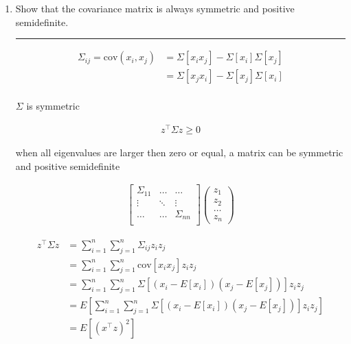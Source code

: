 \documentclass[12pt]{article}
\begin{document}
\begin{enumerate}
    \item Show that the covariance matrix is always symmetric and positive semidefinite.
     
    \noindent\rule{\linewidth}{1pt}
    \begin{align*}
        \Sigma_{ij} = \textrm{cov}(x_i,x_j) &= \Sigma[x_i x_j] - \Sigma[x_i] \Sigma[x_j] \\
                                          &= \Sigma[x_j x_i] - \Sigma[x_j] \Sigma[x_i] \\
    \end{align*}

    $\Sigma$ is symmetric

    \begin{align*}
        z^\intercal \Sigma z \geq 0
    \end{align*}
    
    when all eigenvalues are larger then zero or equal, a matrix can be symmetric and positive semidefinite

    \begin{align*}
        [z_1 z_2 \dots z_n] 
        \begin{bmatrix}
            \Sigma_{11}      &   \dots            &   \dots            \\
            \vdots           &   \ddots           &   \vdots           \\
            \dots            &   \dots            &   \Sigma_{nn}      \\
        \end{bmatrix}
        \begin{pmatrix}
            z_1     \\
            z_2     \\
            \dots  \\
            z_n
        \end{pmatrix}
    \end{align*}

    \begin{align*}
        z^\intercal \Sigma z &= \sum_{i=1}^{n} \sum_{j=1}^{n} \Sigma_{ij} z_i z_j \\
                             &= \sum_{i=1}^{n} \sum_{j=1}^{n} \textrm{cov}[x_i x_j] z_i z_j \\
                             &= \sum_{i=1}^{n} \sum_{j=1}^{n} \Sigma[(x_i - E[x_i])(x_j - E[x_j])] z_i z_j \\
                             &= E[\sum_{i=1}^{n} \sum_{j=1}^{n} \Sigma[(x_i - E[x_i])(x_j - E[x_j])] z_i z_j] \\
                             &= E[(x^\intercal z)^2] \\
    \end{align*}


\end{enumerate}
\end{document}
